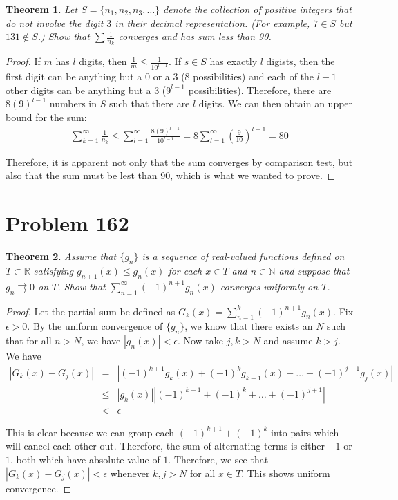 \documentclass[psamsfonts]{amsart}
\newtheorem{thm}{Theorem}[section]
\theoremstyle{definition}
\theoremstyle{remark}
\numberwithin{equation}{section}
\begin{document}
\begin{thm}
Let $S = \{ n_1, n_2, n_3, \ldots \}$ denote the collection of positive integers that do not involve the digit $3$ in their decimal representation. (For example, $7 \in S$ but $131 \notin S$.) Show that $\sum \frac{1}{n_k}$ converges and has sum less than 90.
\end{thm}

\begin{proof}
If $m$ has $l$ digits, then $\frac{1}{m} \leq \frac{1}{10^{l-1}}$. If $ s \in S$ has exactly $l$ digists, then the first digit can be anything but a $0$ or a $3$ (8 possibilities) and each of the $l-1$ other digits can be anything but a $3$ ($9^{l-1}$ possibilities). Therefore, there are $8 (9)^{l-1}$ numbers in $S$ such that there are $l$ digits. We can then obtain an upper bound for the sum:
\begin{eqnarray}
\sum_{k = 1}^\infty \frac{1}{n_k} \leq \sum_{l=1}^\infty \frac{8 (9)^{l-1}}{10^{l-1}} = 8 \sum_{l=1}^\infty \left( \frac{9}{10} \right)^{l-1} = 80
\end{eqnarray}

Therefore, it is apparent not only that the sum converges by comparison test, but also that the sum must be lest than 90, which is what we wanted to prove. 
\end{proof}

\section{Problem 162}

\begin{thm}
Assume that $\{ g_n \}$ is a sequence of real-valued functions defined on $T \subset \mathbb{R}$ satisfying $g_{n+1} (x) \leq g_n(x)$ for each $x \in T$ and $n \in \mathbb{N}$ and suppose that $g_n \rightrightarrows 0$ on $T$. Show that $\sum_{n=1}^\infty (-1)^{n+1} g_n(x)$ converges uniformly on $T$. 
\end{thm}

\begin{proof}
Let the partial sum be defined as $G_k(x) = \sum_{n=1}^k (-1)^{n+1} g_n(x)$. Fix $\epsilon > 0$. By the uniform convergence of $\{ g_n \}$, we know that there exists an $N$ such that for all $n > N$, we have $|g_n(x)| < \epsilon$. Now take $j,k > N$ and assume $k > j$. We have 
\begin{eqnarray}
|G_k(x) - G_j(x)| &=& |(-1)^{k+1} g_k(x) + (-1)^{k} g_{k-1} (x) + \ldots + (-1)^{j+1} g_j(x) | \\
&\leq& |g_k(x)| | (-1)^{k+1} + (-1)^{k} + \ldots + (-1)^{j+1} | \\
&<& \epsilon 
\end{eqnarray}

This is clear because we can group each $(-1)^{k+1} + (-1)^{k}$ into pairs which will cancel each other out. Therefore, the sum of alternating terms is either $-1$ or $1$, both which have absolute value of $1$. Therefore, we see that $|G_k(x) - G_j(x)| < \epsilon$ whenever $k,j > N$ for all $x \in T$. This shows uniform convergence.
\end{proof}
\end{document}
